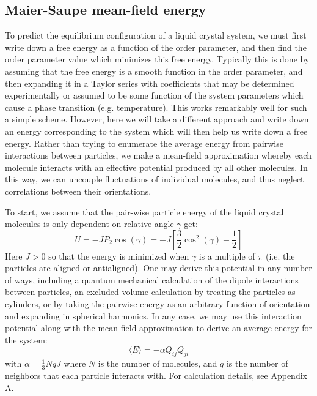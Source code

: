 \documentclass[reqno]{article}
\begin{document}
  \subsection{Maier-Saupe mean-field energy}
  To predict the equilibrium configuration of a liquid crystal system, we must
  first write down a free energy as a function of the order parameter, and then
  find the order parameter value which minimizes this free energy.
  Typically this is done by assuming that the free energy is a smooth function
  in the order parameter, and then expanding it in a Taylor series with
  coefficients that may be determined experimentally or assumed to be some
  function of the system parameters which cause a phase transition (e.g.
  temperature).
  This works remarkably well for such a simple scheme.
  However, here we will take a different approach and write down an energy
  corresponding to the system which will then help us write down a free energy.
  Rather than trying to enumerate the average energy from pairwise interactions
  between particles, we make a mean-field approximation whereby each molecule
  interacts with an effective potential produced by all other molecules.
  In this way, we can uncouple fluctuations of individual molecules, and thus
  neglect correlations between their orientations.

  To start, we assume that the pair-wise particle energy of the liquid crystal
  molecules is only dependent on relative angle $\gamma$ get:
  \begin{equation} \label{eq:maier-saupe-pairwise}
    U = -J P_2 \cos(\gamma) = -J \left[ \frac32 \cos^2(\gamma) - \frac12 \right]
  \end{equation}
  Here $J > 0$ so that the energy is minimized when $\gamma$ is a multiple of
  $\pi$ (i.e. the particles are aligned or antialigned).
  One may derive this potential in any number of ways, including a quantum
  mechanical calculation of the dipole interactions between particles, an
  excluded volume calculation by treating the particles as cylinders, or by
  taking the pairwise energy as an arbitrary function of orientation and
  expanding in spherical harmonics.
  In any case, we may use this interaction potential along with the mean-field
  approximation to derive an average energy for the system:
  \begin{equation}
    \langle E \rangle
    =
    -\alpha Q_{ij} Q_{ji}
  \end{equation}
  with $\alpha = \frac13 N q J$ where $N$ is the number of molecules, and $q$ is
  the number of neighbors that each particle interacts with.
  For calculation details, see Appendix A.
\end{document}

